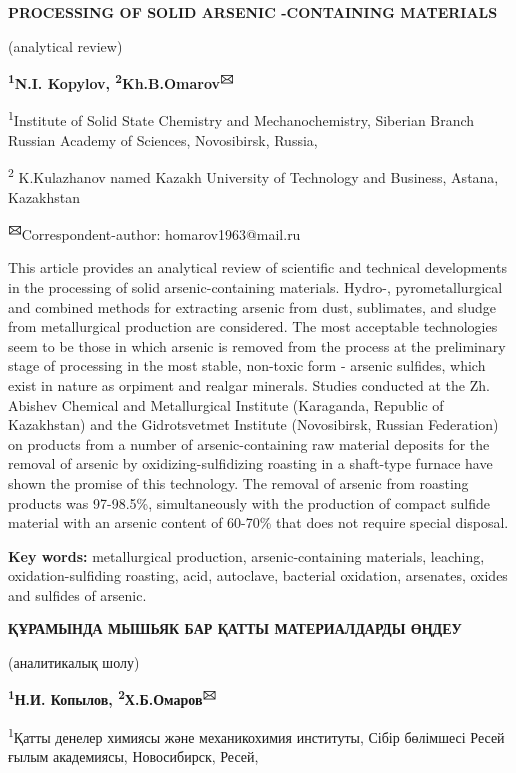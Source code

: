 {\bfseries PROCESSING OF SOLID ARSENIC -CONTAINING MATERIALS}

(analytical review)

{\bfseries \textsuperscript{1}N.I. Kopylov,
\textsuperscript{2}Kh.B.Omarov\textsuperscript{🖂}}

\textsuperscript{1}Institute of Solid State Chemistry and
Mechanochemistry, Siberian Branch Russian Academy of Sciences,
Novosibirsk, Russia,

\textsuperscript{2} K.Kulazhanov named Kazakh University of Technology
and Business, Astana, Kazakhstan

{\bfseries \textsuperscript{🖂}}Correspondent-author: homarov1963@mail.ru

This article provides an analytical review of scientific and technical
developments in the processing of solid arsenic-containing materials.
Hydro-, pyrometallurgical and combined methods for extracting arsenic
from dust, sublimates, and sludge from metallurgical production are
considered. The most acceptable technologies seem to be those in which
arsenic is removed from the process at the preliminary stage of
processing in the most stable, non-toxic form - arsenic sulfides, which
exist in nature as orpiment and realgar minerals. Studies conducted at
the Zh. Abishev Chemical and Metallurgical Institute (Karaganda,
Republic of Kazakhstan) and the Gidrotsvetmet Institute (Novosibirsk,
Russian Federation) on products from a number of arsenic-containing raw
material deposits for the removal of arsenic by oxidizing-sulfidizing
roasting in a shaft-type furnace have shown the promise of this
technology. The removal of arsenic from roasting products was 97-98.5\%,
simultaneously with the production of compact sulfide material with an
arsenic content of 60-70\% that does not require special disposal.

{\bfseries Key words:} metallurgical production, arsenic-containing
materials, leaching, oxidation-sulfiding roasting, acid, autoclave,
bacterial oxidation, arsenates, oxides and sulfides of arsenic.

{\bfseries ҚҰРАМЫНДА МЫШЬЯК БАР ҚАТТЫ МАТЕРИАЛДАРДЫ ӨҢДЕУ}

(аналитикалық шолу)

{\bfseries \textsuperscript{1}Н.И. Копылов,
\textsuperscript{2}Х.Б.Омаров\textsuperscript{🖂}}

\textsuperscript{1}Қатты денелер химиясы және механикохимия институты,
Сібір бөлімшесі Ресей ғылым академиясы, Новосибирск, Ресей,


